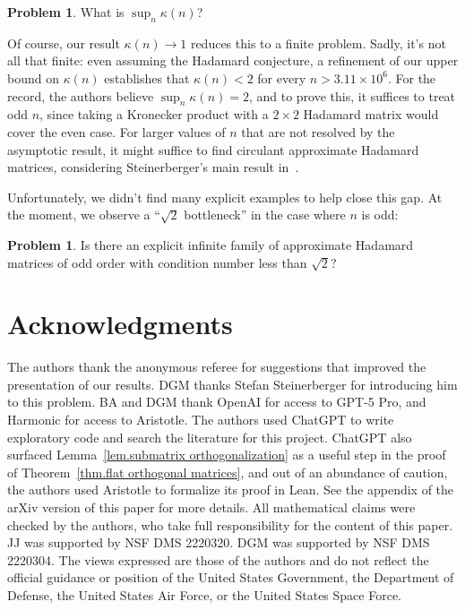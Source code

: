 \documentclass[11pt]{article}
\theoremstyle{plain}
\theoremstyle{definition}
\newtheorem{problem}[theorem]{Problem}
\begin{document}
\begin{problem}
What is $\sup_n\kappa(n)$?
\end{problem}

Of course, our result $\kappa(n)\to1$ reduces this to a finite problem.
Sadly, it's not all that finite:
even assuming the Hadamard conjecture, a refinement of our upper bound on $\kappa(n)$ establishes that $\kappa(n)<2$ for every $n > 3.11 \times 10^6$.
For the record, the authors believe $\sup_n\kappa(n)=2$, and to prove this, it suffices to treat odd $n$, since taking a Kronecker product with a $2\times 2$ Hadamard matrix would cover the even case.
For larger values of $n$ that are not resolved by the asymptotic result, it might suffice to find circulant approximate Hadamard matrices, considering Steinerberger's main result in~\cite{Steinerberger:24}.

Unfortunately, we didn't find many explicit examples to help close this gap.
At the moment, we observe a ``$\sqrt{2}$ bottleneck'' in the case where $n$ is odd:

\begin{problem}
Is there an explicit infinite family of approximate Hadamard matrices of odd order with condition number less than $\sqrt{2}$?
\end{problem}




\section*{Acknowledgments}

The authors thank the anonymous referee for suggestions that improved the presentation of our results.
DGM thanks Stefan Steinerberger for introducing him to this problem.
BA and DGM thank OpenAI for access to GPT-5 Pro, and Harmonic for access to Aristotle.
The authors used ChatGPT to write exploratory code and search the literature for this project. 
ChatGPT also surfaced Lemma~\ref{lem.submatrix orthogonalization} as a useful step in the proof of Theorem~\ref{thm.flat orthogonal matrices}, and out of an abundance of caution, the authors used Aristotle to formalize its proof in Lean.
See the appendix of the arXiv version of this paper for more details.
All mathematical claims  were checked by the authors, who take full responsibility for the content of this paper.
JJ was supported by NSF DMS 2220320. 
DGM was supported by NSF DMS 2220304. 
The views expressed are those of the authors and do not reflect the official guidance or position of the United States Government, the Department of Defense, the United States Air Force, or the United States Space Force.
\end{document}
